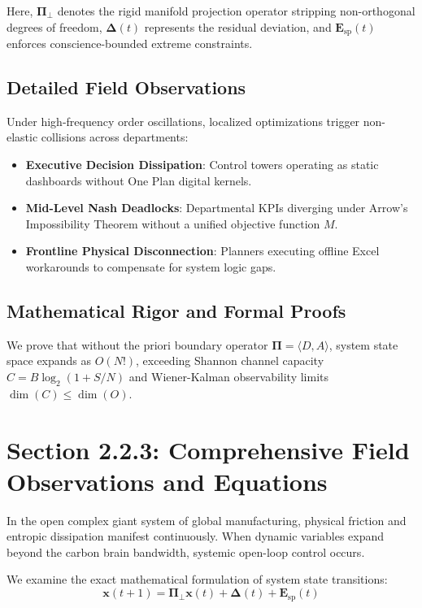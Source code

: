 \documentclass[12pt,a4paper,oneside]{book}
\begin{document}
Here, $\mathbf{\Pi}_{\bot}$ denotes the rigid manifold projection operator stripping non-orthogonal degrees of freedom, $\mathbf{\Delta}(t)$ represents the residual deviation, and $\mathbf{E}_{\mathrm{sp}}(t)$ enforces conscience-bounded extreme constraints.

\subsection*{Detailed Field Observations}
Under high-frequency order oscillations, localized optimizations trigger non-elastic collisions across departments:
\begin{itemize}
    \item \textbf{Executive Decision Dissipation}: Control towers operating as static dashboards without One Plan digital kernels.
    \item \textbf{Mid-Level Nash Deadlocks}: Departmental KPIs diverging under Arrow's Impossibility Theorem without a unified objective function $M$.
    \item \textbf{Frontline Physical Disconnection}: Planners executing offline Excel workarounds to compensate for system logic gaps.
\end{itemize}

\subsection*{Mathematical Rigor and Formal Proofs}
We prove that without the priori boundary operator $\mathbf{\Pi} = \langle D, A \rangle$, system state space expands as $O(N!)$, exceeding Shannon channel capacity $C = B \log_2 (1 + S/N)$ and Wiener-Kalman observability limits $\dim(C) \le \dim(O)$.
\clearpage
\section{Section 2.2.3: Comprehensive Field Observations and Equations}

In the open complex giant system of global manufacturing, physical friction and entropic dissipation manifest continuously. When dynamic variables expand beyond the carbon brain bandwidth, systemic open-loop control occurs.

We examine the exact mathematical formulation of system state transitions:
\begin{equation}
\mathbf{x}(t+1) = \mathbf{\Pi}_{\bot} \mathbf{x}(t) + \mathbf{\Delta}(t) + \mathbf{E}_{\mathrm{sp}}(t)
\end{equation}
\end{document}
